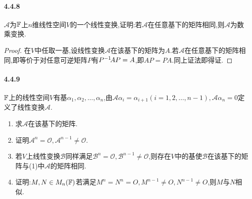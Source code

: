 \documentclass[11pt]{article}
\begin{document}
\paragraph{4.4.8}$\mathscr{A}$为$\mathbb{F}$上$n$维线性空间$V$的一个线性变换,证明:若$\mathscr{A}$在任意基下的矩阵相同,则$\mathscr{A}$为数乘变换.
\begin{proof}
    在$V$中任取一基,设线性变换$\mathscr{A}$在该基下的矩阵为$A$.若$\mathscr{A}$在任意基下的矩阵相同,即等价于对任意可逆矩阵$P$有$P^{-1}\! AP=A$,即$AP=PA$.同上证法即得证.
\end{proof}
\paragraph{4.4.9}$\mathbb{F}$上的线性空间$V$有基$\alpha_1,\alpha_2,\dots,\alpha_n$,由$\mathscr{A}\alpha_i=\alpha_{i+1} (i=1,2,\dots,n-1), \mathscr{A}\alpha_n=0$定义了线性变换$\mathscr{A}$.
\begin{enumerate}
    \item 求$\mathscr{A}$在该基下的矩阵.
    \item 证明$\mathscr{A}^n=\mathscr{O}, \mathscr{A}^{n-1}\neq\mathscr{O}$.
    \item 若$V$上线性变换$\mathscr{B}$同样满足$\mathscr{B}^n=\mathscr{O}, \mathscr{B}^{n-1}\neq\mathscr{O}$,则存在$V$中的基使$\mathscr{B}$在该基下的矩阵与(1)中$\mathscr{A}$的矩阵相同.
    \item 证明:$M,N\in M_n(\mathbb{F})$若满足$M^n=N^n=O, M^{n-1}\neq O, N^{n-1}\neq O$,则$M$与$N$相似.
\end{enumerate}
\end{document}
